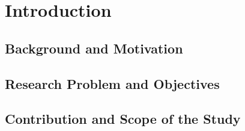 \newpage\section{Introduction}

\subsection{Background and Motivation}

\subsection{Research Problem and Objectives}

\subsection{Contribution and Scope of the Study}



